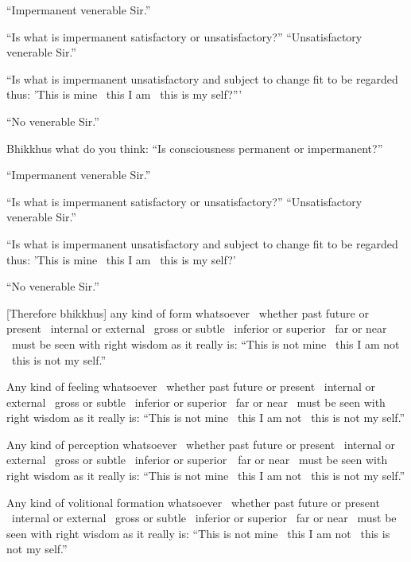 ``Impermanent venerable Sir.''

``Is what is impermanent satisfactory or unsatisfactory?'' ``Unsatisfactory venerable Sir.''

``Is what is impermanent unsatisfactory and subject to change fit to be regarded thus: 'This is mine \breathmark\ this I am \breathmark\ this is my self?'''

``No venerable Sir.''

Bhikkhus what do you think: ``Is consciousness permanent or impermanent?''

``Impermanent venerable Sir.''

``Is what is impermanent satisfactory or unsatisfactory?'' ``Unsatisfactory venerable Sir.''

``Is what is impermanent unsatisfactory and subject to change fit to be regarded thus: 'This is mine \breathmark\ this I am \breathmark\ this is my self?'

``No venerable Sir.''

[Therefore bhikkhus] any kind of form whatsoever \breathmark\ whether past future or present \breathmark\ internal or external \breathmark\ gross or subtle \breathmark\ inferior or superior \breathmark\ far or near \breathmark\ must be seen with right wisdom as it really is: ``This is not mine \breathmark\ this I am not \breathmark\ this is not my self.''

Any kind of feeling whatsoever \breathmark\ whether past future or present \breathmark\ internal or external \breathmark\ gross or subtle \breathmark\ inferior or superior \breathmark\ far or near \breathmark\ must be seen with right wisdom as it really is: ``This is not mine \breathmark\ this I am not \breathmark\ this is not my self.''

Any kind of perception whatsoever \breathmark\ whether past future or present \breathmark\ internal or external \breathmark\ gross or subtle \breathmark\ inferior or \mbox{superior}~\breathmark\ far or near \breathmark\ must be seen with right wisdom as it really is: ``This is not mine \breathmark\ this I am not \breathmark\ this is not my self.''

Any kind of volitional formation whatsoever \breathmark\ whether past future or present \breathmark\ internal or external \breathmark\ gross or subtle \breathmark\ inferior or superior \breathmark\ far or near \breathmark\ must be seen with right wisdom as it really is: ``This is not mine \breathmark\ this I am not \breathmark\ this is not my self.''

